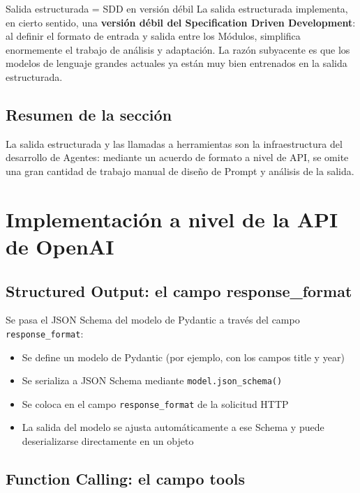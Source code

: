 \documentclass[a4paper]{article}
\begin{document}
\begin{importantbox}{Salida estructurada = SDD en versión débil}
La salida estructurada implementa, en cierto sentido, una \textbf{versión débil del Specification Driven Development}: al definir el formato de entrada y salida entre los Módulos, simplifica enormemente el trabajo de análisis y adaptación. La razón subyacente es que los modelos de lenguaje grandes actuales ya están muy bien entrenados en la salida estructurada.
\end{importantbox}

\subsection{Resumen de la sección}

La salida estructurada y las llamadas a herramientas son la infraestructura del desarrollo de Agentes: mediante un acuerdo de formato a nivel de API, se omite una gran cantidad de trabajo manual de diseño de Prompt y análisis de la salida.

\section{Implementación a nivel de la API de OpenAI}

\subsection{Structured Output: el campo response\_format}

Se pasa el JSON Schema del modelo de Pydantic a través del campo \texttt{response\_format}:

\begin{itemize}
    \item Se define un modelo de Pydantic (por ejemplo, con los campos title y year)
    \item Se serializa a JSON Schema mediante \texttt{model.json\_schema()}
    \item Se coloca en el campo \texttt{response\_format} de la solicitud HTTP
    \item La salida del modelo se ajusta automáticamente a ese Schema y puede deserializarse directamente en un objeto
\end{itemize}

\subsection{Function Calling: el campo tools}
\end{document}
